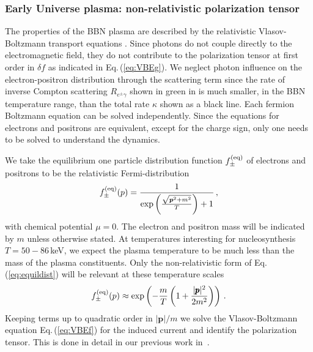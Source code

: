 \subsubsection{Early Universe plasma: non-relativistic polarization tensor}\label{sec:kinetic_theory}
The properties of the BBN plasma are described by the relativistic Vlasov-Boltzmann transport equations . Since photons do not couple directly to the electromagnetic field, they do not contribute to the polarization tensor at first order in $\delta f$ as indicated in Eq.\,(\ref{eq:VBEg}). We neglect photon influence on the electron-positron distribution through the scattering term since the rate of inverse Compton scattering $R_{e^{\pm}\gamma }$ shown in green in  is much smaller, in the BBN temperature range, than the total rate $\kappa$ shown as a black line. Each fermion Boltzmann equation  can be solved independently. Since the equations for electrons and positrons are equivalent, except for the charge sign, only one needs to be solved to understand the dynamics.


We take the equilibrium one particle distribution function $f_\pm^{(\mathrm{eq})}$ of electrons and positrons to be the relativistic Fermi-distribution
\begin{equation}\label{eq:equildist}
f^{(\mathrm{eq})}_\pm(p) = \frac{1}{\exp{\left(\frac{\sqrt{\boldsymbol{p}^2 + m^2}}{T}\right)}
+1}\,,
\end{equation}
with chemical potential $\mu = 0 $. The electron and positron mass will be indicated by $m$ unless otherwise stated. At temperatures interesting for nucleosynthesis $T = 50-86$\,keV, we expect the plasma temperature to be much less than the mass of the plasma constituents. Only the non-relativistic form of Eq.\,(\ref{eq:equildist}) will be relevant at these temperature scales
\begin{equation}
f^{(\mathrm{eq})}_\pm(p) \approx \exp\left(- \frac{m}{T}\left(1+\frac{|\pmb{p}|^2}{2m^2}\right)\right)\,.
\end{equation}
Keeping terms up to quadratic order in $|\boldsymbol{p}|/m$ we solve the Vlasov-Boltzmann equation Eq.\,(\ref{eq:VBEf}) for the induced current and identify the polarization tensor. This is done in detail in our previous work in~\cite{Formanek:2021blc}.

